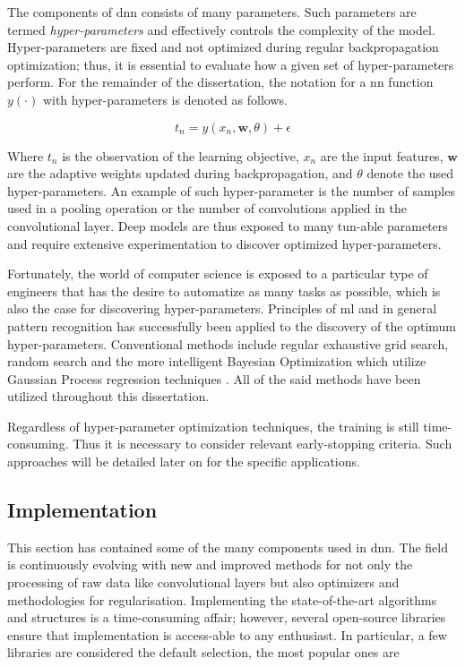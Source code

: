 The components of \gls{dnn} consists of many parameters. Such parameters are termed \emph{hyper-parameters} and effectively controls the complexity of the model. Hyper-parameters are fixed and not optimized during regular backpropagation optimization; thus, it is essential to evaluate how a given set of hyper-parameters perform. For the remainder of the dissertation, the notation for a \gls{nn} function $y(\cdot)$ with hyper-parameters is denoted as follows.

\begin{equation}
    t_n = y(x_n, \mathbf{w}, \theta) + \epsilon
\end{equation}

Where $t_n$ is the observation of the learning objective, $x_n$ are the input features, $\mathbf{w}$ are the adaptive weights updated during backpropagation, and $\theta$ denote the used hyper-parameters. An example of such hyper-parameter is the number of samples used in a pooling operation or the number of convolutions applied in the convolutional layer. Deep models are thus exposed to many tun-able parameters and require extensive experimentation to discover optimized hyper-parameters.

Fortunately, the world of computer science is exposed to a particular type of engineers that has the desire to automatize as many tasks as possible, which is also the case for discovering hyper-parameters. Principles of \gls{ml} and in general pattern recognition has successfully been applied to the discovery of the optimum hyper-parameters. Conventional methods include regular exhaustive grid search, random search and the more intelligent Bayesian Optimization which utilize Gaussian Process regression techniques \cite{YuHyper-ParameterApplications}. All of the said methods have been utilized throughout this dissertation.

Regardless of hyper-parameter optimization techniques, the training is still time-consuming. Thus it is necessary to consider relevant early-stopping criteria. Such approaches will be detailed later on for the specific applications.


\subsection{Implementation}
This section has contained some of the many components used in \gls{dnn}. The field is continuously evolving with new and improved methods for not only the processing of raw data like convolutional layers but also optimizers and methodologies for regularisation.  Implementing the state-of-the-art algorithms and structures is a time-consuming affair; however, several open-source libraries ensure that implementation is access-able to any enthusiast. In particular, a few libraries are considered the default selection, the most popular ones are 

